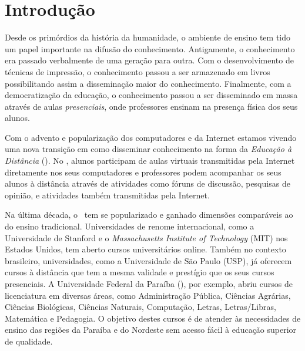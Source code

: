 \chapter{Introdu{\c c}{\~ a}o}

Desde os prim{\' o}rdios da hist{\' o}ria da humanidade, o ambiente de ensino tem tido um papel
importante na difus{\~ a}o do conhecimento. Antigamente, o conhecimento era passado
verbalmente de uma gera{\c c}{\~ a}o para outra. Com o desenvolvimento de t{\' e}cnicas de
impress{\~ a}o, o conhecimento
passou a ser armazenado em livros possibilitando assim a dissemina{\c c}{\~ a}o maior do conhecimento. 
Finalmente, com a democratiza{\c c}{\~ a}o da educa{\c c}{\~ a}o, o conhecimento passou a ser disseminado em massa 
atrav{\' e}s de aulas \emph{presenciais}, onde professores ensinam na presen{\c c}a f{\' i}sica dos seus alunos. 

Com o advento e populariza{\c c}{\~ a}o dos computadores e da Internet 
estamos vivendo uma nova transi{\c c}{\~ a}o em como disseminar conhecimento na forma da \emph{Educa{\c c}{\~ a}o {\` a} Dist{\^ a}ncia} (\ead). 
No \ead, alunos participam de aulas virtuais transmitidas pela Internet
diretamente nos seus computadores
e professores podem acompanhar os seus alunos {\` a} dist{\^ a}ncia atrav{\' e}s de atividades como 
f{\' o}runs de discuss{\~ a}o, pesquisas de opini{\~ a}o, e atividades tamb{\' e}m transmitidas
pela Internet.

Na {\' u}ltima d{\' e}cada, o \ead\ tem se popularizado e ganhado dimens{\~ o}es compar{\' a}veis ao do ensino 
tradicional. Universidades de renome internacional, como a Universidade de Stanford e o \emph{Massachusetts Institute of 
Technology} (MIT) nos Estados Unidos, tem aberto cursos universit{\' a}rios online. Tamb{\' e}m no contexto brasileiro, 
universidades, como a Universidade de S{\~ a}o Paulo (USP), j{\' a} oferecem cursos 
{\` a} dist{\^ a}ncia que tem a mesma validade e prest{\' i}gio que os seus cursos presenciais. 
A Universidade Federal da Para{\' i}ba (\ufpb), por exemplo, abriu cursos de licenciatura em 
diversas {\' a}reas, como Administra{\c c}{\~ a}o P{\' u}blica, Ci{\^ e}ncias Agr{\' a}rias, Ci{\^ e}ncias Biol{\' o}gicas, Ci{\^ e}ncias Naturais,
Computa{\c c}{\~ a}o, Letras, Letras/Libras, Matem{\' a}tica e Pedagogia. O objetivo destes cursos
{\' e} de atender {\` a}s necessidades de ensino das regi{\~ o}es da Para{\' i}ba e do Nordeste sem acesso f{\' a}cil
{\` a} educa{\c c}{\~ a}o superior de qualidade. 

